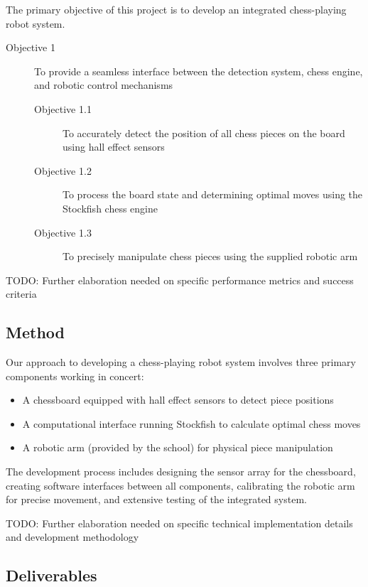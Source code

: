 The primary objective of this project is to develop an integrated chess-playing robot system.
\begin{description}
  \item[Objective 1] To provide a seamless interface between the detection system, chess engine, and robotic control mechanisms
        \begin{description}
          \item[Objective 1.1] To accurately detect the position of all chess pieces on the board using hall effect sensors
          \item[Objective 1.2] To process the board state and determining optimal moves using the Stockfish chess engine
          \item[Objective 1.3] To precisely manipulate chess pieces using the supplied robotic arm
        \end{description}
\end{description}

TODO: Further elaboration needed on specific performance metrics and success criteria

\subsection{Method}
\label{sec:method}

Our approach to developing a chess-playing robot system involves three primary components working in concert:
\begin{itemize}
  \item A chessboard equipped with hall effect sensors to detect piece positions
  \item A computational interface running Stockfish to calculate optimal chess moves
  \item A robotic arm (provided by the school) for physical piece manipulation
\end{itemize}

The development process includes designing the sensor array for the chessboard, creating software interfaces between all components, calibrating the robotic arm for precise movement, and extensive testing of the integrated system.

TODO:  Further elaboration needed on specific technical implementation details and development methodology

\subsection{Deliverables}
\label{sec:deliverables}

